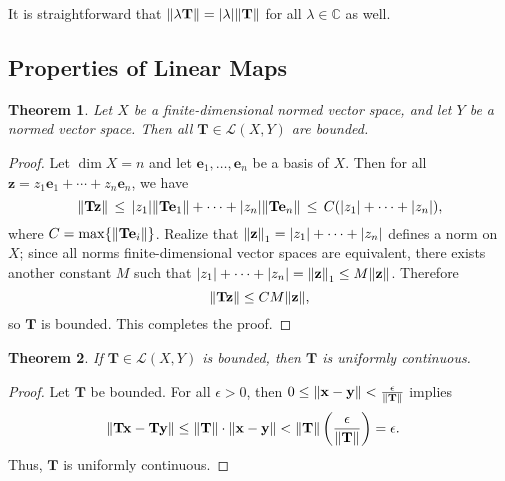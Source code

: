 \documentclass[11pt]{article}
\renewcommand{\vec}[1]{\mathbf{#1}}
\newcommand{\mat}[1]{\mathbf{#1}}
\newtheorem{theorem}{Theorem}
\begin{document}
It is straightforward that $\norm{\lambda \mat{T}} = \abs{\lambda} \norm{\mat{T}}$ for all $\lambda \in \mathbb{C}$ as well.

\newpage


\subsection{Properties of Linear Maps}

\begin{adjustwidth}{0.5cm}{}
  \begin{theorem}
    Let $X$ be a finite-dimensional normed vector space, and let $Y$ be a normed vector space. Then all $\mat{T} \in \mathcal{L}(X, Y)$ are bounded.
  \end{theorem}  
  \begin{proof}
    Let $\dim X = n$ and let $\vec{e}_{1}, \ldots, \vec{e}_{n}$ be a basis of $X$. Then for all $\vec{z} = z_{1} \vec{e}_{1} + \cdots + z_{n} \vec{e}_{n}$, we have
    \[
      \norm{\mat{T} \vec{z}} \, \le \,  \abs{z_{1}} \norm{\mat{T} \vec{e}_{1}} + \cdots + \abs{z_{n}} \norm{\mat{T} \vec{e}_{n}} \, \le \, C (\abs{z_{1}} + \cdots + \abs{z_{n}}),
    \]
    where $C = \max \{ \norm{\mat{T} \vec{e}_{i}} \}$. Realize that $\norm{\vec{z}}_{1} = \abs{z_{1}} + \cdots + \abs{z_{n}}$ defines a norm on $X$; since all norms finite-dimensional vector spaces are equivalent, there exists another constant $M$ such that $\abs{z_{1}} + \cdots + \abs{z_{n}} = \norm{\vec{z}}_{1} \le M \norm{\vec{z}}$. Therefore
    \[
      \norm{\mat{T} \vec{z}} \le CM \norm{\vec{z}},
    \]
    so $\mat{T}$ is bounded. This completes the proof.
  \end{proof}
\end{adjustwidth}

\begin{theorem}
	If $\mat{T} \in \mathcal{L}(X, Y)$ is bounded, then $\mat{T}$ is uniformly continuous.
\end{theorem}
\begin{adjustwidth}{0.5cm}{}
    \begin{proof}
		Let $\mat{T}$ be bounded. For all $\epsilon > 0$, then $0 \le \norm{\vec{x} - \vec{y}} < \tfrac{\epsilon}{\norm{\mat{T}}}$ implies
		\begin{align*}
			\norm{\mat{T} \vec{x} - \mat{T} \vec{y}} &\le \norm{\mat{T}} \cdot \norm{\vec{x} - \vec{y}} < \norm{\mat{T}} \left( \frac{\epsilon}{\norm{\mat{T}}} \right) = \epsilon.
		\end{align*}
		Thus, $\mat{T}$ is uniformly continuous.
	\end{proof}
\end{adjustwidth}
\end{document}
